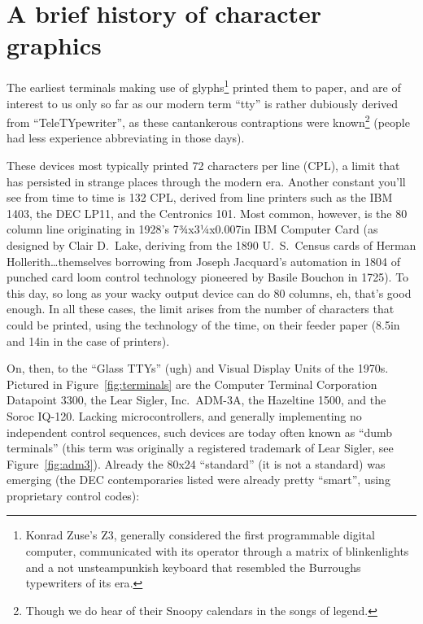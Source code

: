 \section{A brief history of character graphics}
\label{sec:terminals}
The earliest terminals making use of glyphs\footnote{Konrad Zuse's Z3, generally
 considered the first programmable digital computer, communicated with its
operator through a matrix of blinkenlights and a not unsteampunkish keyboard that resembled the
Burroughs typewriters of its era\cite{zuse}.} printed them to paper, and are of
interest to us only so far as our modern term ``tty'' is rather dubiously
derived from ``TeleTYpewriter'', as these cantankerous contraptions were
known\footnote{Though we do hear of their Snoopy calendars in the songs of
legend\cite{quiche}.} (people had less experience abbreviating in those days).

These devices most typically printed 72 characters per line (CPL), a limit that
has persisted in strange places\cite{pandoc} through the modern era. Another constant
you'll see from time to time is 132 CPL, derived from line printers such as the
IBM 1403, the DEC LP11, and the Centronics 101\cite{ibm1403}. Most common,
however, is the 80 column line originating in 1928's 7¾x3¼x0.007in IBM
Computer Card (as designed by Clair D.\ Lake, deriving from the 1890 U.\ S.\
Census cards of Herman Hollerith\ldots themselves borrowing from Joseph
Jacquard's automation in 1804 of punched card loom control technology pioneered
by Basile Bouchon in 1725\cite{cards}). To this day, so long as your wacky
output device can do 80 columns, eh, that's good enough. In all these cases,
the limit arises from the number of characters that could be printed, using the
technology of the time, on their feeder paper (8.5in and 14in in the case of
printers).

On, then, to the ``Glass TTYs'' (ugh) and Visual Display Units of the 1970s.
Pictured in Figure~\ref{fig:terminals} are the Computer Terminal Corporation
Datapoint 3300, the Lear Sigler, Inc.\ ADM-3A, the Hazeltine 1500, and the
Soroc IQ-120. Lacking microcontrollers, and generally implementing no
independent control sequences, such devices are today often known as ``dumb
terminals'' (this term was originally a registered trademark of Lear Sigler,
see Figure~\ref{fig:adm3}). Already the 80x24 ``standard'' (it is not a standard) was emerging
(the DEC contemporaries listed were already pretty ``smart'', using proprietary
control codes):

